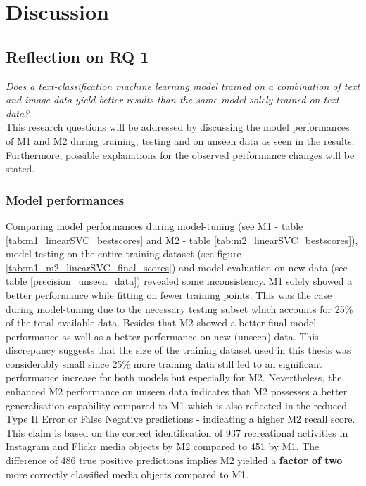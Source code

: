 \chapter{Discussion} \label{discussion}

\section{Reflection on RQ 1}\label{discussion_rq1}

\textit{Does a text-classification machine learning model trained on a combination of text and image data yield better results than the same model solely trained on text data?}\\

This research questions will be addressed by discussing the model performances of M1 and M2 during training, testing and on unseen data as seen in the results. Furthermore, possible explanations for the observed performance changes will be stated.

\subsection{Model performances}

Comparing model performances during model-tuning (see M1 - table \ref{tab:m1_linearSVC_bestscores} and M2 - table \ref{tab:m2_linearSVC_bestscores}), model-testing on the entire training dataset (see figure \ref{tab:m1_m2_linearSVC_final_scores}) and model-evaluation on new data (see table \ref{precision_unseen_data}) revealed some inconsistency. M1 solely showed a better performance while fitting on fewer training points. This was the case during model-tuning due to the necessary testing subset which accounts for 25\% of the total available data. Besides that M2 showed a better final model performance as well as a better performance on new (unseen) data. This discrepancy suggests that the size of the training dataset used in this thesis was considerably small since 25\% more training data still led to an significant performance increase for both models but especially for M2. Nevertheless, the enhanced M2 performance on unseen data indicates that M2 possesses a better generalisation capability compared to M1 which is also reflected in the reduced Type II Error or False Negative predictions - indicating a higher M2 recall score. This claim is based on the correct identification of 937 recreational activities in Instagram and Flickr media objects by M2 compared to 451 by M1. The difference of 486 true positive predictions implies M2 yielded a \textbf{factor of two} more correctly classified media objects compared to M1.\\

